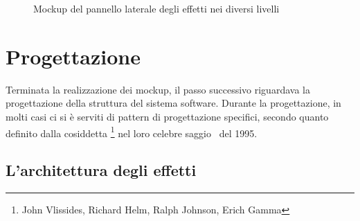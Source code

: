\begin{description}
\begin{figure}[htbp]
{                    }%
                    \qquad{\LARGE$\Rightarrow$}\qquad
                    \caption{Mockup del pannello laterale degli effetti nei diversi livelli\label{fig:mock:allEffects}}
                \end{figure}

        \end{description}

    \section{Progettazione}\label{sec:progettazione}
        Terminata la realizzazione dei mockup, il passo successivo riguardava la progettazione della struttura del sistema software.
        Durante la progettazione, in molti casi ci si è serviti di pattern di progettazione specifici, secondo quanto definito dalla cosiddetta \footnote{John Vlissides, Richard Helm, Ralph Johnson, Erich Gamma} nel loro celebre saggio~\cite{designPattern} del 1995.

        \subsection{L'architettura degli effetti}\label{subsec:effetti}
